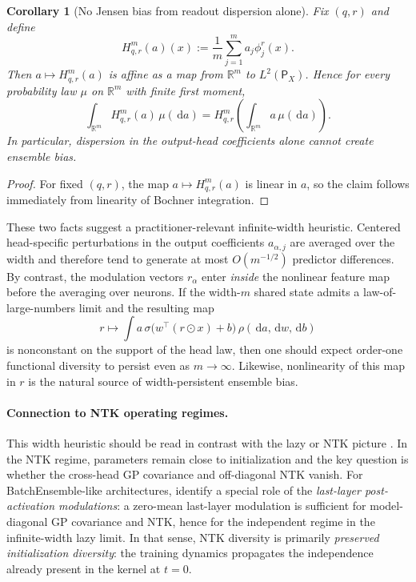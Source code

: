 \documentclass{article}
\newtheorem{corollary}[theorem]{Corollary}
\theoremstyle{definition}
\newcommand{\R}{\mathbb{R}}
\newcommand{\dd}{\,\mathrm{d}}
\begin{document}
\begin{corollary}[No Jensen bias from readout dispersion alone]
\label{cor:readout-affine}
Fix $(q,r)$ and define
\[
  H_{q,r}^m(a)(x)
  :=
  \frac1m\sum_{j=1}^m a_j\phi_j^r(x).
\]
Then $a\mapsto H_{q,r}^m(a)$ is affine as a map from $\R^m$ to
$L^2(\mathsf P_X)$. Hence for every probability law $\mu$ on $\R^m$ with finite
first moment,
\[
  \int_{\R^m} H_{q,r}^m(a)\,\mu(\dd a)
  =
  H_{q,r}^m\!\left(
    \int_{\R^m} a\,\mu(\dd a)
  \right).
\]
In particular, dispersion in the output-head coefficients alone cannot create
ensemble bias.
\end{corollary}

\begin{proof}
For fixed $(q,r)$, the map $a\mapsto H_{q,r}^m(a)$ is linear in $a$, so the
claim follows immediately from linearity of Bochner integration.
\end{proof}

These two facts suggest a practitioner-relevant infinite-width heuristic.
Centered head-specific perturbations in the output coefficients $a_{\alpha,j}$
are averaged over the width and therefore tend to generate at most
$O(m^{-1/2})$ predictor differences. By contrast, the modulation vectors
$r_\alpha$ enter \emph{inside} the nonlinear feature map before the averaging
over neurons. If the width-$m$ shared state admits a law-of-large-numbers limit
and the resulting map
\[
  r\mapsto
  \int a\,\sigma\bigl(w^\top(r\odot x)+b\bigr)\,\rho(\dd a,\dd w,\dd b)
\]
is nonconstant on the support of the head law, then one should expect
order-one functional diversity to persist even as $m\to\infty$. Likewise,
nonlinearity of this map in $r$ is the natural source of width-persistent
ensemble bias.

\paragraph{Connection to NTK operating regimes.}
This width heuristic should be read in contrast with the lazy or NTK picture
\citep{embedded-ensembles,chizat2019lazy}. In the NTK regime, parameters remain
close to initialization and the key question is whether the cross-head GP
covariance and off-diagonal NTK vanish. For BatchEnsemble-like architectures,
\citet{embedded-ensembles} identify a special role of the \emph{last-layer
post-activation modulations}: a zero-mean last-layer modulation is sufficient
for model-diagonal GP covariance and NTK, hence for the independent regime in
the infinite-width lazy limit. In that sense, NTK diversity is primarily
\emph{preserved initialization diversity}: the training dynamics propagates the
independence already present in the kernel at $t=0$.
\end{document}
